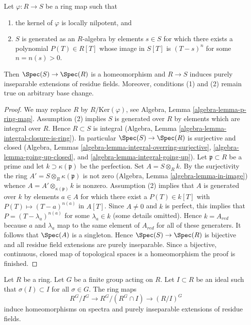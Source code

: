 \begin{lemma}
\label{lemma-universally-bijective}
Let $\varphi : R \to S$ be a ring map such that
\begin{enumerate}
\item the kernel of $\varphi$ is locally nilpotent, and
\item $S$ is generated as an $R$-algebra by elements $s \in S$
for which there exists a polynomial $P(T) \in R[T]$
whose image in $S[T]$ is $(T - s)^n$ for some $n = n(s) > 0$.
\end{enumerate}
Then $\Spec(S) \to \Spec(R)$ is a homeomorphism and $R \to S$
induces purely inseparable extensions of residue fields.
Moreover, conditions (1) and (2) remain true on arbitrary base change.
\end{lemma}

\begin{proof}
We may replace $R$ by $R/\text{Ker}(\varphi)$, see
Algebra, Lemma \ref{algebra-lemma-p-ring-map}.
Assumption (2) implies $S$ is generated over $R$ by
elements which are integral over $R$.
Hence $R \subset S$ is integral
(Algebra, Lemma \ref{algebra-lemma-integral-closure-is-ring}).
In particular $\Spec(S) \to \Spec(R)$ is surjective and closed
(Algebra, Lemmas \ref{algebra-lemma-integral-overring-surjective},
\ref{algebra-lemma-going-up-closed}, and
\ref{algebra-lemma-integral-going-up}).
Let $\mathfrak p \subset R$ be a prime and let
$k \supset \kappa(\mathfrak p)$ be the perfection.
Set $A = S \otimes_R k$. By the surjectivity
the ring $A' = S \otimes_R \kappa(\mathfrak p)$ is not zero
(Algebra, Lemma \ref{algebra-lemma-in-image})
whence $A = A' \otimes_{\kappa(\mathfrak p)} k$ is nonzero.
Assumption (2) implies that $A$ is generated over $k$ by elements
$a \in A$ for which there exist a $P(T) \in k[T]$ with
$P(T) \mapsto (T - a)^{n(a)}$ in $A[T]$. Since $A \not = 0$ and
$k$ is perfect, this implies that $P = (T - \lambda_a)^{n(a)}$
for some $\lambda_a \in k$ (some details omitted).
Hence $k = A_{red}$ because $a$ and $\lambda_a$
map to the same element of $A_{red}$ for all of these generaters.
It follows that $\Spec(A)$ is a singleton.
Hence $\Spec(S) \to \Spec(R)$ is bijective and all residue field extensions
are purely inseparable. Since a bijective, continuous, closed map
of topological spaces is a homeomorphism the proof is finished.
\end{proof}

\begin{lemma}
\label{lemma-invariants-modulo}
Let $R$ be a ring. Let $G$ be a finite group acting on $R$. Let $I \subset R$
be an ideal such that $\sigma(I) \subset I$ for all $\sigma \in G$.
The ring maps
$$
R^G/I^G \longrightarrow R^G/(R^G \cap I) \longrightarrow (R/I)^G
$$
induce homeomorphisms on spectra and purely inseparable extensions of
residue fields.
\end{lemma}

